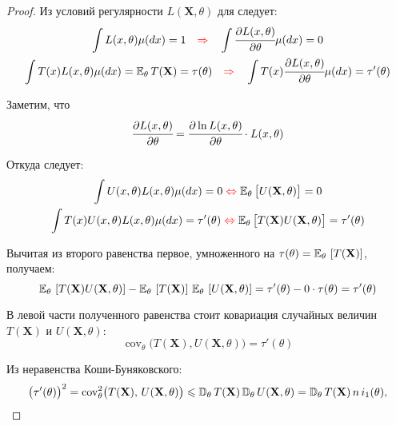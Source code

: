 \begin{proof}
    Из условий регулярности $L(\mathbf{X}, \theta)$ для следует:
    \begin{gather*}
        \int L(x, \theta) \mu(d x)=1 
        \quad {\color{red}\Rightarrow } \quad
        \int \cfrac{\partial L(x, \theta)}{\partial \theta} \mu(d x)=0 \\
        \int T(x) L(x, \theta) \mu(d x)=\mathbb{E}_{\theta}\, T(\mathbf{X})=\tau(\theta) 
        \quad {\color{red}\Rightarrow } \quad
        \int T(x) \cfrac{\partial L(x, \theta)}{\partial \theta} \mu(d x)=\tau'(\theta)
    \end{gather*}

    Заметим, что
    \begin{equation*}
        \cfrac{\partial L(x, \theta)}{\partial \theta}=\cfrac{\partial \ln L(x, \theta)}{\partial \theta} \cdot L(x, \theta)
    \end{equation*}

    Откуда следует:
    \begin{gather*}
        \int U(x, \theta) L(x, \theta) \mu(d x) = 0 \; {\color{red}\Leftrightarrow} \; \mathbb{E}_{\theta}\, \bigl[U(\mathbf{X}, \theta)\bigr]=0 \\
        \int T(x) U(x, \theta) L(x, \theta) \mu(d x) = \tau'(\theta) \; {\color{red}\Leftrightarrow} \; \mathbb{E}_{\theta}\, \bigl[ T(\mathbf{X}) U(\mathbf{X}, \theta) \bigr] = \tau'(\theta)
    \end{gather*}

    Вычитая из второго равенства первое, умноженного на $\tau(\theta) = \mathbb{E}_{\theta}\, \left[ T(\mathbf{X}) \right]$, получаем:
    \begin{equation*}
        \mathbb{E}_{\theta}\,\left[T(\mathbf{X}) U(\mathbf{X}, \theta)\right] - \mathbb{E}_{\theta}\,\left[T(\mathbf{X})\right] \, \mathbb{E}_{\theta}\,\left[U(\mathbf{X}, \theta)\right] = 
        \tau'(\theta) - 0 \cdot \tau(\theta) = 
        \tau'(\theta)
    \end{equation*}

    В левой части полученного равенства стоит ковариация случайных величин $T(\mathbf{X})$ и $U(\mathbf{X},\theta)$:
    \begin{equation*}
        \operatorname{cov}_{\theta}\bigl(T(\mathbf{X}), U(\mathbf{X}, \theta)\bigr)=\tau'(\theta)
    \end{equation*}

    Из неравенства Коши-Буняковского:
    \begin{equation*}
        \bigl(\tau'(\theta)\bigr)^{2}=\operatorname{cov}_{\theta}^{2} \bigl(T(\mathbf{X}), \, U(\mathbf{X}, \theta)\bigr) \leqslant 
        \mathbb{D}_{\theta}\, T(\mathbf{X}) \,\mathbb{D}_{\theta}\, U(\mathbf{X}, \theta) = 
        \mathbb{D}_{\theta}\, T(\mathbf{X}) \, n \, i_1(\theta),
    \end{equation*}


\end{proof}
